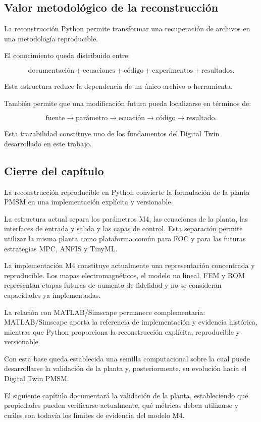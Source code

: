 \subsection{Valor metodológico de la reconstrucción}

La reconstrucción Python permite transformar una recuperación de archivos en una metodología reproducible.

El conocimiento queda distribuido entre:

\begin{equation}
\text{documentación}
+
\text{ecuaciones}
+
\text{código}
+
\text{experimentos}
+
\text{resultados}.
\end{equation}

Esta estructura reduce la dependencia de un único archivo o herramienta.

También permite que una modificación futura pueda localizarse en términos de:

\begin{equation}
\text{fuente}
\rightarrow
\text{parámetro}
\rightarrow
\text{ecuación}
\rightarrow
\text{código}
\rightarrow
\text{resultado}.
\end{equation}

Esta trazabilidad constituye uno de los fundamentos del Digital Twin desarrollado en este trabajo.

\subsection{Cierre del capítulo}

La reconstrucción reproducible en Python convierte la formulación de la planta PMSM en una implementación explícita y versionable.

La estructura actual separa los parámetros M4, las ecuaciones de la planta, las interfaces de entrada y salida y las capas de control. Esta separación permite utilizar la misma planta como plataforma común para FOC y para las futuras estrategias MPC, ANFIS y TinyML.

La implementación M4 constituye actualmente una representación concentrada y reproducible. Los mapas electromagnéticos, el modelo no lineal, FEM y ROM representan etapas futuras de aumento de fidelidad y no se consideran capacidades ya implementadas.

La relación con MATLAB/Simscape permanece complementaria: MATLAB/Simscape aporta la referencia de implementación y evidencia histórica, mientras que Python proporciona la reconstrucción explícita, reproducible y versionable.

Con esta base queda establecida una semilla computacional sobre la cual puede desarrollarse la validación de la planta y, posteriormente, su evolución hacia el Digital Twin PMSM.

El siguiente capítulo documentará la validación de la planta, estableciendo qué propiedades pueden verificarse actualmente, qué métricas deben utilizarse y cuáles son todavía los límites de evidencia del modelo M4.
